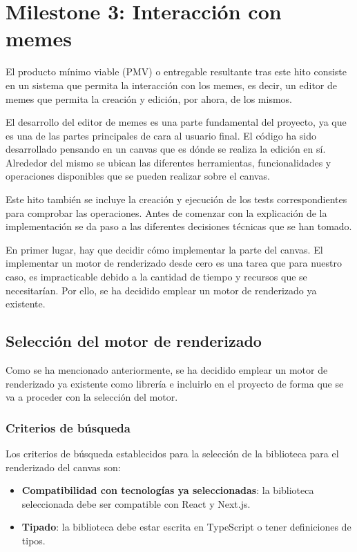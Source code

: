 \section{Milestone 3: Interacción con memes}

El producto mínimo viable (PMV) o entregable resultante tras este hito consiste en un sistema que permita la interacción con los memes, es decir, un editor de memes que permita la creación y edición, por ahora, de los mismos.

El desarrollo del editor de memes es una parte fundamental del proyecto, ya que es una de las partes principales de cara al usuario final. El código ha sido desarrollado pensando en un canvas que es dónde se realiza la edición en sí. Alrededor del mismo se ubican las diferentes herramientas, funcionalidades y operaciones disponibles que se pueden realizar sobre el canvas.

Este hito también se incluye la creación y ejecución de los tests correspondientes para comprobar las operaciones. Antes de comenzar con la explicación de la implementación se da paso a las diferentes decisiones técnicas que se han tomado.

En primer lugar, hay que decidir cómo implementar la parte del canvas. El implementar un motor de renderizado desde cero es una tarea que para nuestro caso, es impracticable debido a la cantidad de tiempo y recursos que se necesitarían. Por ello, se ha decidido emplear un motor de renderizado ya existente.

\subsection{Selección del motor de renderizado}

Como se ha mencionado anteriormente, se ha decidido emplear un motor de renderizado ya existente como librería e incluirlo en el proyecto de forma que se va a proceder con la selección del motor.

\subsubsection{Criterios de búsqueda}

Los criterios de búsqueda establecidos para la selección de la biblioteca para el renderizado del canvas son:

\begin{itemize}
  \item \textbf{Compatibilidad con tecnologías ya seleccionadas}: la biblioteca seleccionada debe ser compatible con React y Next.js.
  \item \textbf{Tipado}: la biblioteca debe estar escrita en TypeScript o tener definiciones de tipos.
\end{itemize}

